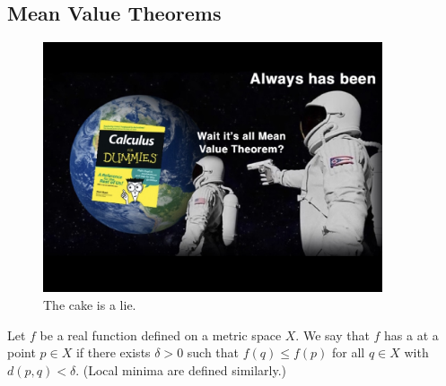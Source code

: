 \documentclass{article}
\begin{document}
\subsection{Mean Value Theorems}
\begin{figure}
    \centering
    \includegraphics[width=10cm]{IMG_0106.jpg}
    \caption{The cake is a lie.}
    \label{fig:astro}
\end{figure}
\begin{definition}
    Let $f$ be a real function defined on a metric space $X$. We say that $f$ has a  at a point $p\in X$ if there exists $\delta>0$ such that $f(q)\leq f(p)$ for all $q\in X$ with $d(p,q)<\delta$. (Local minima are defined similarly.)
\end{definition}
    
\end{document}
